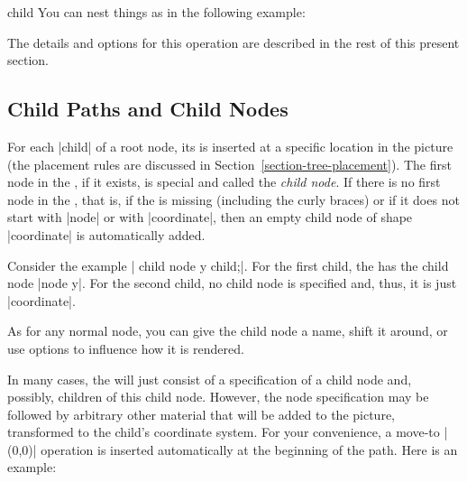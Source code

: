 \begin{pathoperation}{child}{%
        }
    You can nest things as in the following example:
\begin{codeexample}[]
\end{codeexample}

    The details and options for this operation are described in the rest of
    this present section.
\end{pathoperation}


\subsection{Child Paths and Child Nodes}

For each |child| of a root node, its  is inserted at a
specific location in the picture (the placement rules are discussed in
Section~\ref{section-tree-placement}). The first node in the ,
if it exists, is special and called the \emph{child node}. If there is no first
node in the , that is, if the  is missing
(including the curly braces) or if it does not start with |node| or with
|coordinate|, then an empty child node of shape |coordinate| is automatically
added.

Consider the example | child {node {y}} child;|. For the first child,
the  has the child node |node {y}|. For the second child, no
child node is specified and, thus, it is just |coordinate|.

As for any normal node, you can give the child node a name, shift it around, or
use options to influence how it is rendered.
%
\begin{codeexample}[preamble={\usetikzlibrary{shapes.geometric}}]
\end{codeexample}

In many cases, the  will just consist of a specification of a
child node and, possibly, children of this child node. However, the node
specification may be followed by arbitrary other material that will be added to
the picture, transformed to the child's coordinate system. For your
convenience, a move-to |(0,0)| operation is inserted automatically at the
beginning of the path. Here is an example:
%
\begin{codeexample}[]
\end{codeexample}

